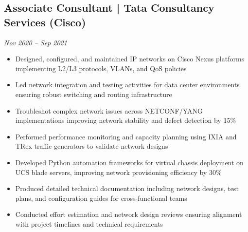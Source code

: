 \documentclass[10pt,a4paper]{article}
\begin{document}
\subsection*{Associate Consultant | Tata Consultancy Services (Cisco)}
\hfill \textit{Nov 2020 -- Sep 2021}
\begin{itemize}
    \item Designed, configured, and maintained IP networks on Cisco Nexus platforms implementing L2/L3 protocols, VLANs, and QoS policies
    \item Led network integration and testing activities for data center environments ensuring robust switching and routing infrastructure
    \item Troubleshot complex network issues across NETCONF/YANG implementations improving network stability and defect detection by 15\%
    \item Performed performance monitoring and capacity planning using IXIA and TRex traffic generators to validate network designs
    \item Developed Python automation frameworks for virtual chassis deployment on UCS blade servers, improving network provisioning efficiency by 30\%
    \item Produced detailed technical documentation including network designs, test plans, and configuration guides for cross-functional teams
    \item Conducted effort estimation and network design reviews ensuring alignment with project timelines and technical requirements
\vspace{2pt}
\end{itemize}

\vspace{2pt}
\end{document}
